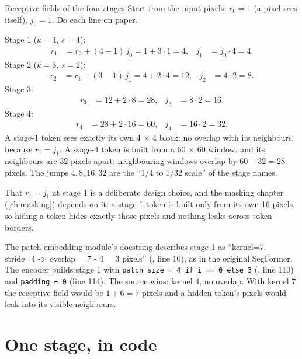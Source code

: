 \begin{worked}[label={we:encoder:rf}]{Receptive fields of the four stages}
Start from the input pixels: $r_0 = 1$ (a pixel sees itself), $j_0 = 1$. Do each line on paper.

Stage 1 ($k = 4$, $s = 4$):
\begin{align*}
r_1 &= r_0 + (4 - 1)\, j_0 = 1 + 3 \cdot 1 = 4, & j_1 &= j_0 \cdot 4 = 4 .
\end{align*}
Stage 2 ($k = 3$, $s = 2$):
\begin{align*}
r_2 &= r_1 + (3 - 1)\, j_1 = 4 + 2 \cdot 4 = 12, & j_2 &= 4 \cdot 2 = 8 .
\end{align*}
Stage 3:
\begin{align*}
r_3 &= 12 + 2 \cdot 8 = 28, & j_3 &= 8 \cdot 2 = 16 .
\end{align*}
Stage 4:
\begin{align*}
r_4 &= 28 + 2 \cdot 16 = 60, & j_4 &= 16 \cdot 2 = 32 .
\end{align*}
A stage-1 token sees exactly its own 4 $\times$ 4 block: no overlap with its neighbours, because $r_1
= j_1$. A stage-4 token is built from a 60 $\times$ 60 window, and its neighbours are 32 pixels apart:
neighbouring windows overlap by $60 - 32 = 28$ pixels. The jumps $4, 8, 16, 32$ are the ``1/4 to 1/32
scale'' of the stage names.
\end{worked}

That $r_1 = j_1$ at stage 1 is a deliberate design choice, and the masking chapter (\cref{ch:masking})
depends on it: a stage-1 token is built only from its own 16 pixels, so hiding a token hides exactly
those pixels and nothing leaks across token borders.

\begin{sourcenote}
The patch-embedding module's docstring describes stage 1 as ``kernel=7, stride=4 -> overlap = 7 - 4 = 3
pixels'' (, line 10), as in the
original SegFormer. The encoder builds stage 1 with \lstinline|patch_size = 4 if i == 0 else 3|
(, line 110) and \lstinline|padding = 0| (line 114). The source wins: kernel 4,
no overlap. With kernel 7 the receptive field would be $1 + 6 = 7$ pixels and a hidden token's pixels
would leak into its visible neighbours.
\end{sourcenote}

\section{One stage, in code}\label{sec:encoder:loop}

